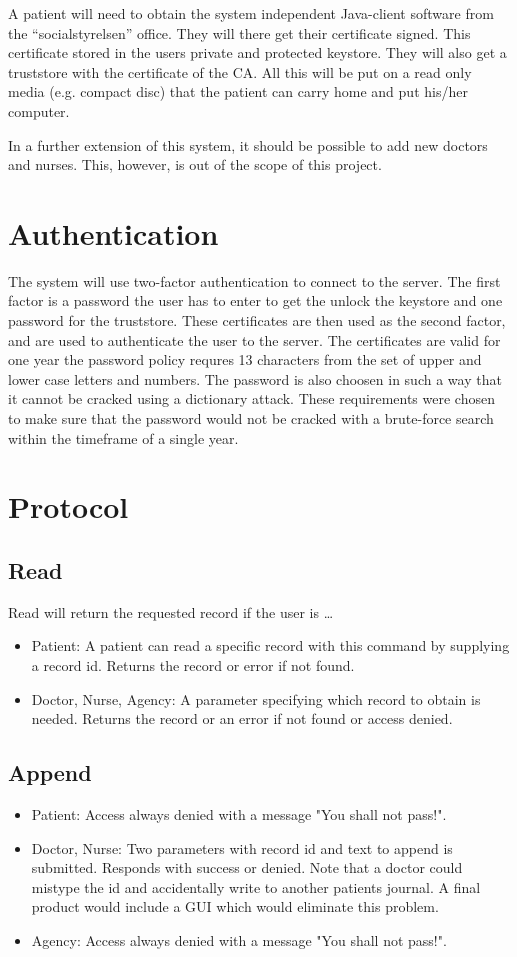 \documentclass[10pt, a4paper]{article}
\begin{document}
A patient will need to obtain the system independent Java-client software from the ``socialstyrelsen'' office. They will there get their certificate signed. This certificate stored in the users private and protected keystore. They will also get a truststore with the certificate of the CA. All this will be put on a read only media (e.g. compact disc) that the patient can carry home and put his/her computer.

In a further extension of this system, it should be possible to add new doctors and nurses. This, however, is out of the scope of this project.

\section{Authentication}
The system will use two-factor authentication to connect to the server. The first factor is a password the user has to enter to get the unlock the keystore and one password for the truststore. These certificates are then used as the second factor, and are used to authenticate the user to the server. The certificates are valid for one year the password policy requres 13 characters from the set of upper and lower case letters and numbers. The password is also choosen in such a way that it cannot be cracked using a dictionary attack. These requirements were chosen to make sure that the password would not be cracked with a brute-force search within the timeframe of a single year.

\section{Protocol}
\subsection{Read}
Read will return the requested record if the user is \ldots
\begin{itemize}
	\item Patient: A patient can read a specific record with this command by supplying a record id. Returns the record or error if not found.
	\item Doctor, Nurse, Agency: A parameter specifying which record to obtain is needed. Returns the record or an error if not found or access denied.
\end{itemize}

\subsection{Append}
\begin{itemize}
\item Patient: Access always denied with a message "You shall not pass!".
\item Doctor, Nurse: Two parameters with record id and text to append is submitted. Responds with success or denied. Note that a doctor could mistype the id and accidentally write to another patients journal. A final product would include a GUI which would eliminate this problem.
\item Agency: Access always denied with a message "You shall not pass!".
\end{itemize}
\end{document}
